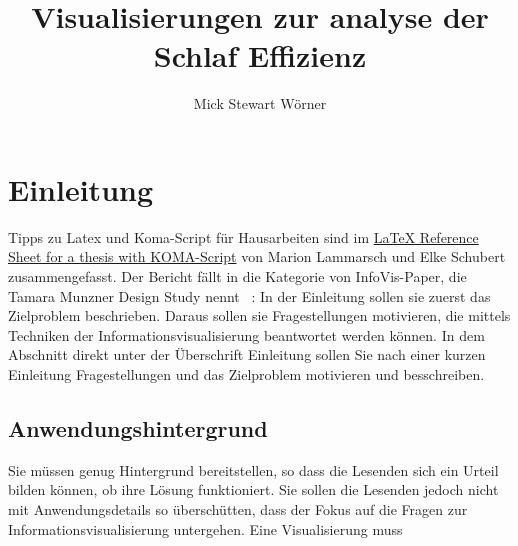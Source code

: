 \documentclass[usegeometry=true]{scrartcl}
\begin{document}
\subject{Projektbericht zum Modul Information Retrieval und Visualisierung Sommersemester 2023}
\title{Visualisierungen zur analyse der Schlaf Effizienz}
\author{Mick Stewart Wörner}%
\maketitle%

\section{Einleitung}
Tipps zu Latex und Koma-Script für Hausarbeiten sind im \href{http://mirrors.ctan.org/info/latex-refsheet/LaTeX_RefSheet.pdf}{LaTeX Reference Sheet for a thesis with KOMA-Script} von Marion Lammarsch und Elke Schubert zusammengefasst. 
Der Bericht fällt in die Kategorie von InfoVis-Paper, die Tamara Munzner Design Study nennt ~\cite{Munzner2008}: In der Einleitung sollen sie zuerst das Zielproblem beschrieben. Daraus sollen sie Fragestellungen motivieren, die mittels Techniken der Informationsvisualisierung beantwortet werden können. In dem Abschnitt direkt unter der Überschrift Einleitung sollen Sie nach einer kurzen Einleitung Fragestellungen und das Zielproblem motivieren und besschreiben. 

\subsection{Anwendungshintergrund}
Sie müssen genug Hintergrund bereitstellen, so dass die Lesenden sich ein Urteil bilden können, ob ihre Lösung funktioniert. 
Sie sollen die Lesenden jedoch nicht mit Anwendungsdetails so überschütten, dass der Fokus auf die Fragen zur Informationsvisualisierung untergehen. 
Eine Visualisierung muss
\end{document}
